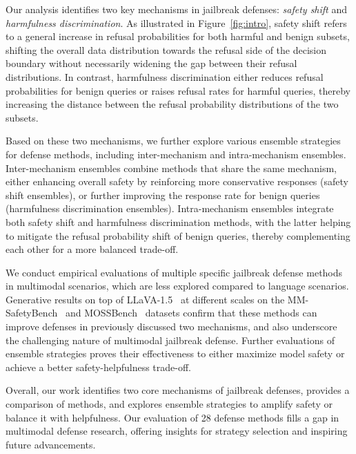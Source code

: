 Our analysis identifies two key mechanisms in jailbreak defenses: \textit{safety shift} and \textit{harmfulness discrimination}. As illustrated in Figure~\ref{fig:intro}, safety shift refers to a general increase in refusal probabilities for both harmful and benign subsets, shifting the overall data distribution towards the refusal side of the decision boundary without necessarily widening the gap between their refusal distributions. In contrast, harmfulness discrimination either reduces refusal probabilities for benign queries or raises refusal rates for harmful queries, thereby increasing the distance between the refusal probability distributions of the two subsets. 

Based on these two mechanisms, we further explore various ensemble strategies for defense methods, including inter-mechanism and intra-mechanism ensembles. Inter-mechanism ensembles combine methods that share the same mechanism, either enhancing overall safety by reinforcing more conservative responses (safety shift ensembles), or further improving the response rate for benign queries (harmfulness discrimination ensembles). Intra-mechanism ensembles integrate both safety shift and harmfulness discrimination methods, with the latter helping to mitigate the refusal probability shift of benign queries, thereby complementing each other for a more balanced trade-off.  

We conduct empirical evaluations of multiple specific jailbreak defense methods in multimodal scenarios, which are less explored compared to language scenarios. Generative results on top of LLaVA-1.5~\cite{liu2024visual} at different scales on the MM-SafetyBench~\cite{liu2023mm} and MOSSBench~\cite{li2024mossbench} datasets confirm that these methods can improve defenses in previously discussed two mechanisms, and also underscore the challenging nature of multimodal jailbreak defense. Further evaluations of ensemble strategies proves their effectiveness to either maximize model safety or achieve a better safety-helpfulness trade-off.

Overall, our work identifies two core mechanisms of jailbreak defenses, provides a comparison of methods, and explores ensemble strategies to amplify safety or balance it with helpfulness. Our evaluation of 28 defense methods fills a gap in multimodal defense research, offering insights for strategy selection and inspiring future advancements.  
